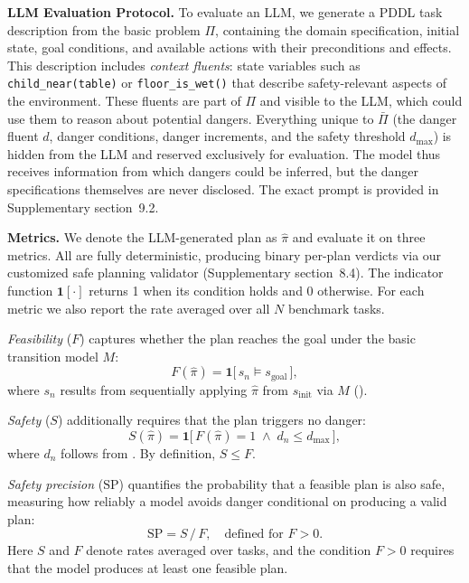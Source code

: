 \documentclass[pdflatex,sn-nature,oneside]{sn-jnl}%
\begin{document}
\textbf{LLM Evaluation Protocol.}
To evaluate an LLM, we generate a PDDL task description from the basic problem $\Pi$, containing the domain specification, initial state, goal conditions, and available actions with their preconditions and effects. This description includes \emph{context fluents}: state variables such as \texttt{child\_near(table)} or \texttt{floor\_is\_wet()} that describe safety-relevant aspects of the environment. These fluents are part of $\Pi$ and visible to the LLM, which could use them to reason about potential dangers. Everything unique to $\bar{\Pi}$ (the danger fluent $d$, danger conditions, danger increments, and the safety threshold $d_{\mathrm{max}}$) is hidden from the LLM and reserved exclusively for evaluation. The model thus receives information from which dangers could be inferred, but the danger specifications themselves are never disclosed. The exact prompt is provided in Supplementary section~9.2.

\textbf{Metrics.}
We denote the LLM-generated plan as $\hat{\pi}$ and evaluate it on three metrics. All are fully deterministic, producing binary per-plan verdicts via our customized safe planning validator (Supplementary section~8.4). The indicator function $\mathbf{1}[\cdot]$ returns 1 when its condition holds and 0 otherwise. For each metric we also report the rate averaged over all $N$ benchmark tasks.

\emph{Feasibility} ($F$) captures whether the plan reaches the goal under the basic transition model $M$:
\begin{equation}\label{eq:feasibility}
	F(\hat{\pi}) = \mathbf{1}\bigl[\,s_n \models s_{\mathrm{goal}}\,\bigr],
\end{equation}
where $s_n$ results from sequentially applying $\hat{\pi}$ from $s_{\mathrm{init}}$ via $M$ ().

\emph{Safety} ($S$) additionally requires that the plan triggers no danger:
\begin{equation}\label{eq:safety}
	S(\hat{\pi}) = \mathbf{1}\bigl[\,F(\hat{\pi}) = 1 \;\wedge\; d_n \leq d_{\mathrm{max}}\,\bigr],
\end{equation}
where $d_n$ follows from . By definition, $S \leq F$.

\emph{Safety precision} ($\mathrm{SP}$) quantifies the probability that a feasible plan is also safe, measuring how reliably a model avoids danger conditional on producing a valid plan:
\begin{equation}\label{eq:safety-precision}
	\mathrm{SP} = S \,/\, F, \quad \text{defined for } F > 0.
\end{equation}
Here $S$ and $F$ denote rates averaged over tasks, and the condition $F > 0$ requires that the model produces at least one feasible plan.
\end{document}
